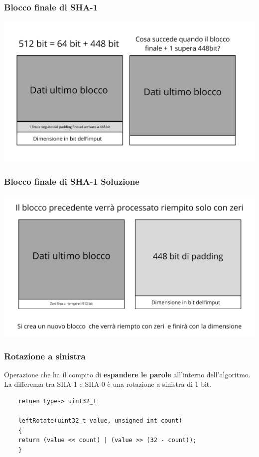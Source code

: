 \begin{frame}
	\frametitle{Blocco finale di SHA-1}
	\begin{center}
		\includegraphics[width=1\textwidth]{img/3-img/blocco-finale1.png}
	\end{center}

\end{frame}

\begin{frame}
	\frametitle{Blocco finale di SHA-1 Soluzione}
	\begin{center}
		\includegraphics[width=1\textwidth]{img/3-img/blocco-finale2.png}
	\end{center}

\end{frame}



\begin{frame}[fragile]
	\frametitle{Rotazione a sinistra}
	Operazione che ha il compito di \textbf{espandere le parole} all'interno dell'algoritmo.
	La differenza tra SHA-1 e SHA-0 è una rotazione a sinistra di 1 bit.

	\vspace{1cm}

	\begin{verbatim}
	retuen type-> uint32_t 
	
	leftRotate(uint32_t value, unsigned int count) 
	{
	return (value << count) | (value >> (32 - count));
	}
    \end{verbatim}
\end{frame}


